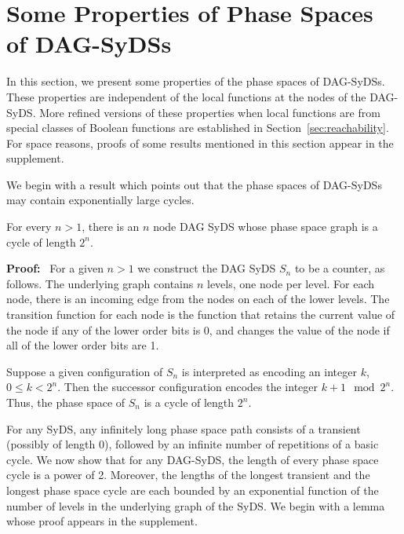 \section{Some Properties of Phase Spaces of DAG-SyDSs}
\label{sec:bounded-levels}

In this section, we present some properties of the
phase spaces of DAG-SyDSs.
These properties are independent of the local functions
at the nodes of the DAG-SyDS.
More refined versions of these properties when local
functions are from special classes of Boolean functions
are established in Section~\ref{sec:reachability}. 
For space reasons, proofs of some results mentioned
in this section appear in the supplement.

We begin with a result which points out that the phase spaces
of DAG-SyDSs may contain exponentially large cycles.

\smallskip
\begin{proposition}\label{pro:long_phase_space_cycle}
For every $n  > 1$, there is an $n$ node DAG SyDS 
whose phase space graph is a cycle of length $2^n$.
\end{proposition}

\noindent
\textbf{Proof:}~ 
For a given $n > 1$ we construct the DAG SyDS $S_n$ to be a counter, as follows.
The underlying graph contains $n$ levels, one node per level. 
For each node, there is an incoming edge from the nodes on each of the lower levels.
The transition function for each node is the function 
that retains the current value of the node if any of the lower order bits is 0,
and changes the value of the node if all of the lower order bits are 1.

Suppose a given configuration of $S_n$ is interpreted as encoding
an integer $k$, $0 \leq k < 2^n$.  Then the successor configuration
encodes the integer $k + 1 \mod 2^n$.  Thus, the phase space of
$S_n$ is a cycle of length $2^n$.  \QED

For any SyDS, any infinitely long phase space path consists of a
transient (possibly of length 0), followed by an infinite number
of repetitions of a basic cycle.  We now show that for any 
DAG-SyDS, the length of every phase space cycle is a power of 2.
Moreover, the lengths of the longest transient and the longest phase
space cycle are each bounded by an exponential function of the
number of levels in the underlying graph of the SyDS.
We begin with a lemma whose proof appears in the supplement.

